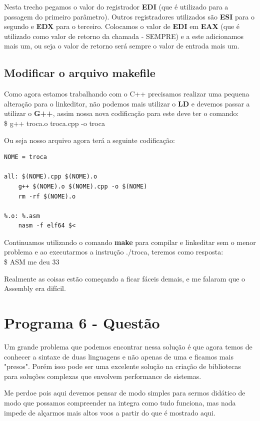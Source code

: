 Nesta trecho pegamos o valor do registrador \textbf{EDI} (que é utilizado para a passagem do primeiro parâmetro). Outros registradores utilizados são \textbf{ESI} para o segundo e \textbf{EDX} para o terceiro. Colocamos o valor de \textbf{EDI} em \textbf{EAX} (que é utilizado como valor de retorno da chamada - SEMPRE) e a este adicionamos mais um, ou seja o valor de retorno será sempre o valor de entrada mais um.

\subsection{Modificar o arquivo makefile}
Como agora estamos trabalhando com o C++ precisamos realizar uma pequena alteração para o linkeditor, não podemos mais utilizar o \textbf{LD} e devemos passar a utilizar o \textbf{G++}, assim nossa nova codificação para este deve ter o comando: \\
{\ttfamily\$ g++ troca.o troca.cpp -o troca}

Ou seja nosso arquivo agora terá a seguinte codificação:
\begin{lstlisting}[]
NOME = troca

all: $(NOME).cpp $(NOME).o
	g++ $(NOME).o $(NOME).cpp -o $(NOME)
	rm -rf $(NOME).o

%.o: %.asm
	nasm -f elf64 $<	
\end{lstlisting}

Continuamos utilizando o comando \textbf{make} para compilar e linkeditar sem o menor problema e ao executarmos a instrução {\ttfamily ./troca}, teremos como resposta: \\
{\ttfamily\$ ASM me deu 33}

Realmente as coisas estão começando a ficar fáceis demais, e me falaram que o Assembly era difícil.

\section{Programa 6 - Questão}
Um grande problema que podemos encontrar nessa solução é que agora temos de conhecer a sintaxe de duas linguagens e não apenas de uma e ficamos mais "presos". Porém isso pode ser uma excelente solução na criação de bibliotecas para soluções complexas que envolvem performance de sistemas.

Me perdoe pois aqui devemos pensar de modo simples para sermos didático de modo que possamos compreender na integra como tudo funciona, mas nada impede de alçarmos mais altos voos a partir do que é mostrado aqui.

